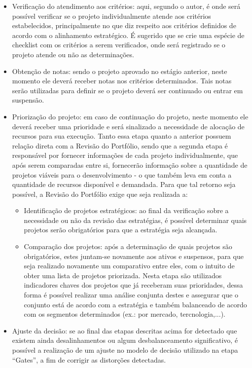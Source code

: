 \documentclass[12pt,a4paper,ruledheader,tocpage=prefix,floatnumber=continuous,pagestart=folhaderosto,font=times]{abnt}
\begin{document}
\begin{itemize}
 \item Verificação do atendimento aos critérios: aqui, segundo o autor, é onde será possível verificar se o projeto individualmente atende aos critérios
       estabelecidos, principalmente no que diz respeito aos critérios definidos de acordo com o alinhamento estratégico. É sugerido que se crie uma espécie
       de checklist com os critérios a serem verificados, onde será registrado se o projeto atende ou não as determinações.
 \item Obtenção de notas: sendo o projeto aprovado no estágio anterior, neste momento ele deverá receber notas nos critérios determinados. Tais notas serão
       utilizadas para definir se o projeto deverá ser continuado ou entrar em suspensão.
 \item Priorização do projeto: em caso de continuação do projeto, neste momento ele deverá receber uma prioridade e será sinalizado a necessidade de alocação
       de recursos para sua execução. Tanto essa etapa quanto a anterior possuem relação direta com a Revisão do Portfólio, sendo que a segunda etapa é
       responsável por fornecer informações de cada projeto individualmente, que após serem comparadas entre si, fornecerão informação sobre a quantidade
       de projetos viáveis para o desenvolvimento - o que também leva em conta a quantidade de recursos disponível e demandada. Para que tal retorno seja
       possível, a Revisão do Portfólio exige que seja realizada a:
       \begin{itemize}
	  \item Identificação de projetos estratégicos: ao final da verificação sobre a necessidade ou não da revisão das estratégias, é possível determinar
		quais projetos serão obrigatórios para que a estratégia seja alcançada.
	  \item Comparação dos projetos: após a determinação de quais projetos são obrigatórios, estes juntam-se novamente aos ativos e suspensos, para
		que seja realizado novamente um comparativo entre eles, com o intuito de obter uma lista de projetos priorizada. Nesta etapa são utilizados
		indicadores chaves dos projetos que já receberam suas prioridades, dessa forma é possível realizar uma análise conjunta destes e assegurar
		que o conjunto está de acordo com a estratégia e também balanceado de acordo com os segmentos determinados (ex.: por mercado, tercnologia,...).
       \end{itemize}
  \item Ajuste da decisão: se ao final das etapas descritas acima for detectado que existem ainda desalinhamentos ou algum desbalanceamento significativo,
	é possível a realização de um ajuste no modelo de decisão utilizado na etapa ``Gates'', a fim de corrigir as distorções detectadas.
\end{itemize}
\end{document}
